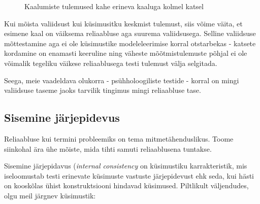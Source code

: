 \documentclass[a4paper,12pt,oneside]{article}
\numberwithin{equation}{section}
\theoremstyle{definition}
\begin{document}
\begin{figure}[H]
\colorbox{background_example}{\parbox{\textwidth}{
}}
\caption{Kaalumiste tulemused kahe erineva kaaluga kolmel katsel}
\end{figure}

Kui mõista valiidsust kui küsimusitku keskmist tulemust, siis võime väita, et esimene kaal on väiksema reliaabluse aga suurema valiidsusega. Selline valiidsuse mõttestamine aga ei ole küsimustike modeleleerimise korral otstarbekas - katsete kordamine on enamasti keeruline ning väheste mõõtmistulemuste põhjal ei ole võimalik tegeliku väikese reliaablusega testi tulemust välja selgitada. 

Seega, meie vaadeldava olukorra - psühholoogiliste testide - korral on mingi valiidsuse taseme jaoks tarvilik tingimus mingi reliaabluse tase.    


\subsection{Sisemine järjepidevus}

Reliaabluse kui termini probleemiks on tema mitmetähenduslikus. Toome siinkohal ära ühe mõiste,  mida tihti samuti reliaablusena tuntakse.

Sisemine järjepidavus (\textit{internal consistency} on küsimustiku karrakteristik, mis iseloomustab testi erinevate k\"usimuste vastuste järjepidevust ehk seda, kui hästi on kooskõlas \"uhist  konstruktsiooni hindavad k\"usimused\cite[177] {Henson2001}. Piltlikult väljendudes, olgu meil järgnev k\"usimustik: 
\end{document}
